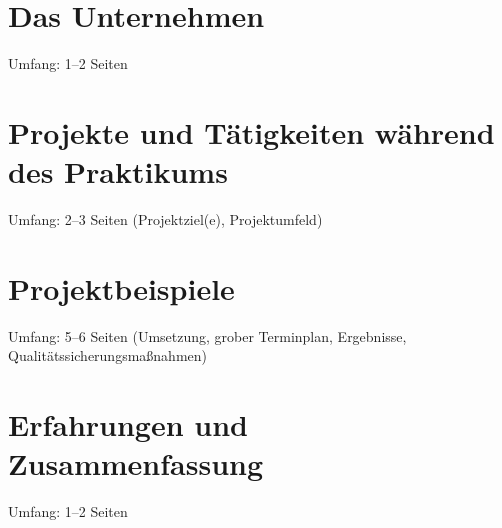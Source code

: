 \documentclass[internship,german,smartquotes]{hgbthesis}
\begin{document}
\mainmatter                             %

\chapter{Das Unternehmen}

Umfang: 1--2 Seiten


\chapter{Projekte und Tätigkeiten während des Praktikums}

Umfang: 2--3 Seiten (Projektziel(e), Projektumfeld)

     
\chapter{Projektbeispiele}

Umfang: 5--6 Seiten (Umsetzung, grober Terminplan, Ergebnisse,
Qualitätssicherungsmaßnahmen)


\chapter{Erfahrungen und Zusammenfassung}

Umfang: 1--2 Seiten


\end{document}
